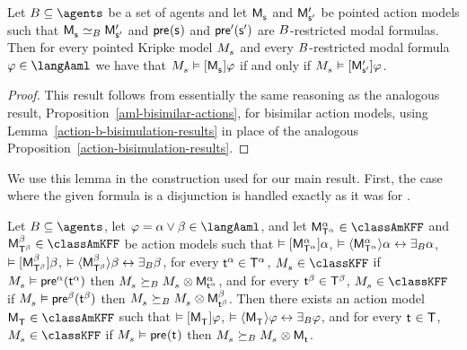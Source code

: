 \begin{corollary}
Let $\agentsB \subseteq \agents$ be a set of agents and let $\aPModel{\aStateS}$ and $\aPModelP{\aStateSP}$ be pointed action models such that $\aPModel{\aStateS} \bisimilar[\agentsB] \aPModelP{\aStateSP}$ and $\aPrecondition(\aStateS)$ and $\aPreconditionP(\aStateSP)$ are $\agentsB$-restricted modal formulas.
Then for every pointed Kripke model $\kPModel{\kStateS}$ and every $\agentsB$-restricted modal formula $\phi \in \langAaml$ we have that $\kPModel{\kStateS} \entails \actionA{\aPModel{\aStateS}} \phi$ if and only if $\kPModel{\kStateS} \entails \actionA{\aPModelP{\aStateSP}} \phi$.
\end{corollary}

\begin{proof}
This result follows from essentially the same reasoning as the analogous result, Proposition~\ref{aml-bisimilar-actions}, for bisimilar action models, using Lemma~\ref{action-b-bisimulation-results} in place of the analogous Proposition~\ref{action-bisimulation-results}.
\end{proof}

We use this lemma in the construction used for our main result.
First, the case where the given formula is a disjunction is handled exactly as it was for \logicAamlK{}.

\begin{lemma}\label{aaml-k45-choice}
Let $\agentsB \subseteq \agents$, 
let $\phi = \alpha \lor \beta \in \langAaml$, and 
let $\aPModel[\alpha]{\aStatesT[\alpha]} \in \classAmKFF$ and $\aPModel[\beta]{\aStatesT[\beta]} \in \classAmKFF$ be action models such that 
$\entails \actionA{\aPModel[\alpha]{\aStatesT[\alpha]}} \alpha$, 
$\entails \actionE{\aPModel[\alpha]{\aStatesT[\alpha]}} \alpha \iff \someactsBs \alpha$, 
$\entails \actionA{\aPModel[\beta]{\aStatesT[\beta]}} \beta$,
$\entails \actionE{\aPModel[\beta]{\aStatesT[\beta]}} \beta \iff \someactsBs \beta$,
for every $\aStateT[\alpha] \in \aStatesT[\alpha]$, $\kPModel{\kStateS} \in \classKFF$ if $\kPModel{\kStateS} \entails \aPrecondition[\alpha](\aStateT[\alpha])$ then $\kPModel{\kStateS} \simulatesBs \kPModel{\kStateS} \exec \aPModel[\alpha]{\aStateT[\alpha]}$, and
for every $\aStateT[\beta] \in \aStatesT[\beta]$, $\kPModel{\kStateS} \in \classKFF$ if $\kPModel{\kStateS} \entails \aPrecondition[\beta](\aStateT[\beta])$ then $\kPModel{\kStateS} \simulatesBs \kPModel{\kStateS} \exec \aPModel[\beta]{\aStateT[\beta]}$.
Then there exists an action model $\aPModel{\aStatesT} \in \classAmKFF$ such that 
$\entails \actionA{\aPModel{\aStatesT}} \phi$,
$\entails \actionE{\aPModel{\aStatesT}} \phi \iff \someactsBs \phi$, and
for every $\aStateT \in \aStatesT$, $\kPModel{\kStateS} \in \classKFF$ if $\kPModel{\kStateS} \entails \aPrecondition(\aStateT)$ then $\kPModel{\kStateS} \simulatesBs \kPModel{\kStateS} \exec \aPModel{\aStateT}$.
\end{lemma}

